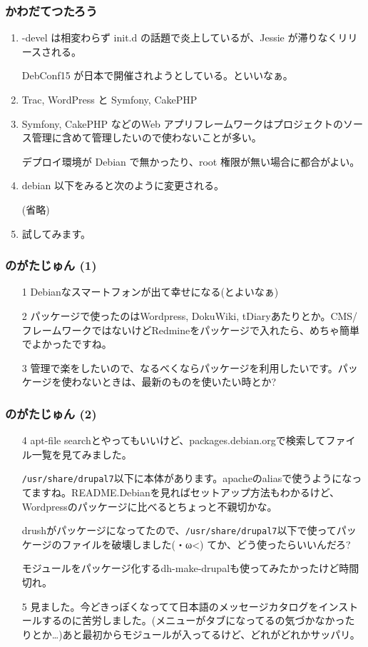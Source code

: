 \documentclass[cjk,dvipdfmx,10pt,compress,%
hyperref={bookmarks=true,bookmarksnumbered=true,bookmarksopen=false,%
colorlinks=false,%
pdftitle={第 68 回 関西 Debian 勉強会},%
pdfauthor={倉敷・のがた・佐々木・かわだ},%
pdfsubject={資料},%
}]{beamer}
\begin{document}

\begin{frame}
  \frametitle{ かわだてつたろう }
  \begin{enumerate}
  \item  -devel は相変わらず init.d の話題で炎上しているが、Jessie が滞りなくリリースされる。

    DebConf15 が日本で開催されようとしている。といいなぁ。
  \item Trac, WordPress と Symfony, CakePHP
  \item Symfony, CakePHP などのWeb アプリフレームワークはプロジェクトのソース管理に含めて管理したいので使わないことが多い。

    デプロイ環境が Debian で無かったり、root 権限が無い場合に都合がよい。
  \item debian 以下をみると次のように変更される。

    (省略)
\item 試してみます。
  \end{enumerate}
\end{frame}

\begin{frame}
\frametitle{ のがたじゅん (1)}
  \begin{enumerate}
  \item[1] Debianなスマートフォンが出て幸せになる(とよいなぁ)
  \item[2] パッケージで使ったのはWordpress, DokuWiki, tDiaryあたりとか。CMS/フレームワークではないけどRedmineをパッケージで入れたら、めちゃ簡単でよかったですね。
  \item[3] 管理で楽をしたいので、なるべくならパッケージを利用したいです。パッケージを使わないときは、最新のものを使いたい時とか?
  \end{enumerate}
\end{frame}

\begin{frame}
\frametitle{ のがたじゅん (2)}
  \begin{enumerate}
  \item[4] apt-file searchとやってもいいけど、packages.debian.orgで検索してファイル一覧を見てみました。

    {\tt /usr/share/drupal7}以下に本体があります。apacheのaliasで使うようになってますね。README.Debianを見ればセットアップ方法もわかるけど、Wordpressのパッケージに比べるとちょっと不親切かな。

    drushがパッケージになってたので、{\tt /usr/share/drupal7}以下で使ってパッケージのファイルを破壊しました(・ω<) てか、どう使ったらいいんだろ?

    モジュールをパッケージ化するdh-make-drupalも使ってみたかったけど時間切れ。
  \item[5] 見ました。今どきっぽくなってて日本語のメッセージカタログをインストールするのに苦労しました。(メニューがタブになってるの気づかなかったりとか…)あと最初からモジュールが入ってるけど、どれがどれかサッパリ。
  \end{enumerate}
\end{frame}
\end{document}
